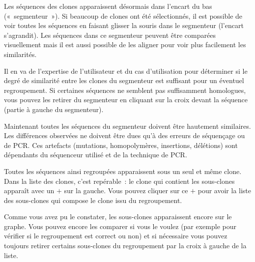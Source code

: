 \documentclass[10pt]{article}
\begin{document}
Les séquences des clones apparaissent désormais dans l'encart du bas
(«~segmenteur~»). Si beaucoup de clones ont été sélectionnés, il est
possible de voir toutes les séquences en faisant glisser la souris dans
le segmenteur (l'encart s'agrandit). Les séquences dans ce segmenteur
peuvent être comparées visuellement mais il est aussi possible de les
aligner pour voir plus facilement les similarités.

Il en va de l'expertise de l'utilisateur et du cas d'utilisation pour déterminer si le degré de
similarité entre les clones du segmenteur est suffisant pour un éventuel
regroupement. Si certaines séquences ne semblent pas suffisamment homologues,
vous pouvez les retirer du segmenteur en cliquant sur la croix devant la
séquence (partie à gauche du segmenteur).


Maintenant toutes les séquences du segmenteur doivent être hautement
similaires. Les différences observées ne doivent être dues qu'à des
erreurs de séquençage ou de PCR. Ces artefacts (mutations,
homopolymères, insertions, délétions) sont dépendants du séquenceur
utilisé et de la technique de PCR.


Toutes les séquences ainsi regroupées apparaissent sous un seul et même
clone. Dans la liste des clones, c'est repérable~: le clone qui contient
les sous-clones apparaît avec un $+$ sur la gauche. Vous pouvez
cliquer sur ce $+$ pour avoir la liste des sous-clones qui compose le
clone issu du regroupement.


Comme vous avez pu le constater, les sous-clones apparaissent encore sur
le graphe. Vous pouvez encore les comparer si vous le voulez (par
exemple pour vérifier si le regroupement est correct ou non) et si nécessaire
vous pouvez toujours retirer certains sous-clones du regroupement par la croix
à gauche de la liste.


\end{document}
